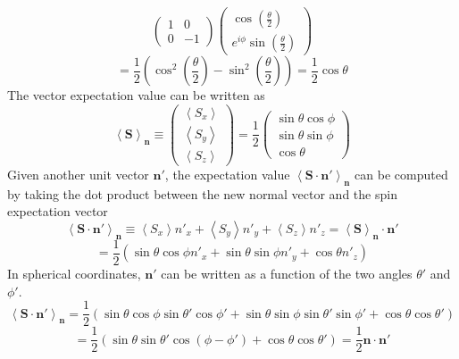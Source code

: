 \begin{sol}
\[            \begin{pmatrix} 1&0\\0&-1 \end{pmatrix}\begin{pmatrix} \cos\left( \frac{\theta}{2} \right)\\e^{i\phi}\sin\left( \frac{\theta}{2} \right)   \end{pmatrix}
        \] 
        \[
            =\frac{1}{2}\left(\cos^2\left( \frac{\theta}{2} \right)-\sin^2\left( \frac{\theta}{2} \right)\right)=\frac{1}{2}\cos\theta  
        \]         
        The vector expectation value can be written as
        \[
            \left<\mathbf{S} \right>_\mathbf{n}\equiv\begin{pmatrix} \left<S_x \right>\\\left<S_y \right>\\\left<S_z \right> \end{pmatrix} =\frac{1}{2}\begin{pmatrix} \sin\theta\cos\phi\\ \sin\theta\sin\phi \\ \cos\theta \end{pmatrix} 
        \] 
        Given another unit vector $\mathbf{n'}$, the expectation value $\left<\mathbf{S}\cdot\mathbf{n'} \right>_\mathbf{n}$ can be computed by taking the dot product between the new normal vector and the spin expectation vector
        \[
            \left<\mathbf{S}\cdot\mathbf{n'} \right>_\mathbf{n}\equiv \left<S_x \right>n'_x+\left<S_y \right>n'_y+\left<S_z \right>n'_z=\left<\mathbf{S} \right>_\mathbf{n}\cdot\mathbf{n'}
        \] 
            \[
             =\frac{1}{2}\left(\sin\theta\cos\phi n'_x+\sin\theta\sin\phi n'_y+\cos\theta n'_z\right)
            \] 
        In spherical coordinates, $\mathbf{n'}$ can be written as a function of the two angles $\theta'$ and $\phi'$.
        \[
        \left<\mathbf{S}\cdot\mathbf{n'} \right>_\mathbf{n}=\frac{1}{2}\left(\sin\theta\cos\phi\sin\theta'\cos\phi'+\sin\theta\sin\phi\sin\theta'\sin\phi'+\cos\theta\cos\theta'\right)
        \] 
        \[
            =\frac{1}{2}\left(\sin\theta\sin\theta'\cos\left(\phi-\phi' \right) + \cos\theta\cos\theta'\right)=\frac{1}{2}\mathbf{n}\cdot\mathbf{n'}
        \] 

\end{sol}